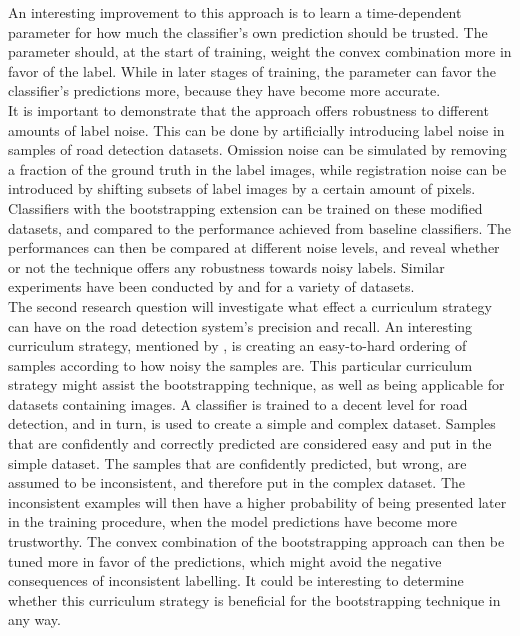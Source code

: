  An interesting improvement to this approach is to learn a time-dependent parameter for how much the classifier's own prediction should be trusted. The parameter should, at the start of training, weight the convex combination more in favor of the label. While in later stages of training, the parameter can favor the classifier's predictions more, because they have become more accurate.\\

It is important to demonstrate that the approach offers robustness to different amounts of label noise. This can be done by artificially introducing label noise in samples of road detection datasets. Omission noise can be simulated by removing a fraction of the ground truth in the label images, while registration noise can be introduced by shifting subsets of label images by a certain amount of pixels. Classifiers with the bootstrapping extension can be trained on these modified datasets, and compared to the performance achieved from baseline classifiers. The performances can then be compared at different noise levels, and reveal whether or not the technique offers any robustness towards noisy labels. Similar experiments have been conducted by \citep{Sukhbaatar_noisy_network_learning} and \citep{Reed_noisy_labels_bootstrapping} for a variety of datasets. \\

The second research question will investigate what effect a curriculum strategy can have on the road detection system's precision and recall. An interesting curriculum strategy, mentioned by \cite{Bengio_curriculumlearning}, is creating an easy-to-hard ordering of samples according to how noisy the samples are. This particular curriculum strategy might assist the bootstrapping technique, as well as being applicable for datasets containing images. A classifier is trained to a decent level for road detection, and in turn, is used to create a simple and complex dataset. Samples that are confidently and correctly predicted are considered easy and put in the simple dataset. The samples that are confidently predicted, but wrong, are assumed to be inconsistent, and therefore put in the complex dataset. The inconsistent examples will then have a higher probability of being presented later in the training procedure, when the model predictions have become more trustworthy. The convex combination of the bootstrapping approach can then be tuned more in favor of the predictions, which might avoid the negative consequences of inconsistent labelling.  It could be interesting to determine whether this curriculum strategy is beneficial for the bootstrapping technique in any way.\\

